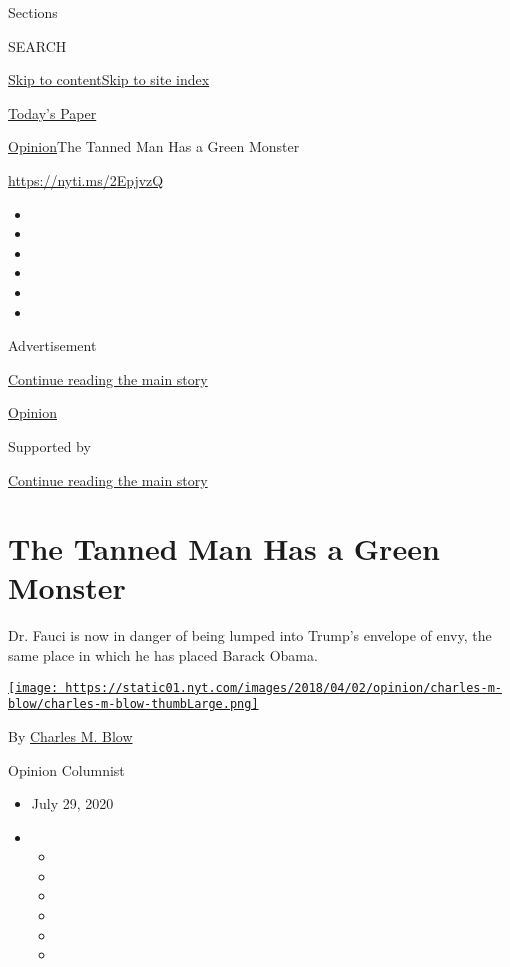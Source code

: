 Sections

SEARCH

\protect\hyperlink{site-content}{Skip to
content}\protect\hyperlink{site-index}{Skip to site index}

\href{https://myaccount.nytimes.com/auth/login?response_type=cookie\&client_id=vi}{}

\href{https://www.nytimes.com/section/todayspaper}{Today's Paper}

\href{/section/opinion}{Opinion}\textbar{}The Tanned Man Has a Green
Monster

\url{https://nyti.ms/2EpjvzQ}

\begin{itemize}
\item
\item
\item
\item
\item
\item
\end{itemize}

Advertisement

\protect\hyperlink{after-top}{Continue reading the main story}

\href{/section/opinion}{Opinion}

Supported by

\protect\hyperlink{after-sponsor}{Continue reading the main story}

\hypertarget{the-tanned-man-has-a-green-monster}{%
\section{The Tanned Man Has a Green
Monster}\label{the-tanned-man-has-a-green-monster}}

Dr. Fauci is now in danger of being lumped into Trump's envelope of
envy, the same place in which he has placed Barack Obama.

\href{https://www.nytimes.com/by/charles-m-blow}{\texttt{[image: https://static01.nyt.com/images/2018/04/02/opinion/charles-m-blow/charles-m-blow-thumbLarge.png]}}

By \href{https://www.nytimes.com/by/charles-m-blow}{Charles M. Blow}

Opinion Columnist

\begin{itemize}
\item
  July 29, 2020
\item
  \begin{itemize}
  \item
  \item
  \item
  \item
  \item
  \item
  \end{itemize}
\end{itemize}


